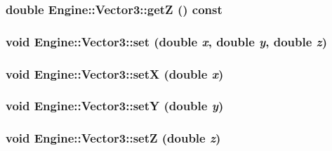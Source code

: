 \subsubsection{\setlength{\rightskip}{0pt plus 5cm}double Engine::Vector3::getZ () const\hspace{0.3cm}{\tt  [inline]}}\label{classEngine_1_1Vector3_1b6ccb0e4bd7e535019fb34443d8aa87}


\subsubsection{\setlength{\rightskip}{0pt plus 5cm}void Engine::Vector3::set (double {\em x}, double {\em y}, double {\em z})\hspace{0.3cm}{\tt  [inline]}}\label{classEngine_1_1Vector3_f2b05c7303f42069e27e5ddcf57865a1}


\subsubsection{\setlength{\rightskip}{0pt plus 5cm}void Engine::Vector3::setX (double {\em x})\hspace{0.3cm}{\tt  [inline]}}\label{classEngine_1_1Vector3_bc03d27540065493d76bf9cc80ac41c2}


\subsubsection{\setlength{\rightskip}{0pt plus 5cm}void Engine::Vector3::setY (double {\em y})\hspace{0.3cm}{\tt  [inline]}}\label{classEngine_1_1Vector3_1f974692f03fd5b650739dffaaf46733}


\subsubsection{\setlength{\rightskip}{0pt plus 5cm}void Engine::Vector3::setZ (double {\em z})\hspace{0.3cm}{\tt  [inline]}}\label{classEngine_1_1Vector3_3a8c7f3f91c31aec42e8dff93252f07a}


